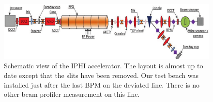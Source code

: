 \begin{figure}[!ht]
  \begin{center}
    \includegraphics[width=\textwidth]{04_IPHI_Test/figures/fig000_IPHI_view.png}
  \end{center}
  \caption[Schematic view of IPHI accelerator]{Schematic view of the IPHI accelerator. The layout is almost up to date except that the slits have been removed. Our test bench was installed just after the last BPM on the deviated line.
    There is no other beam profiler measurement on this line.}
  \label{chap4:IPHI_view}
\end{figure}
